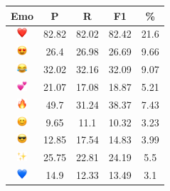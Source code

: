 \documentclass{article}
\begin{document}
\begin{table}
\centering
\begin{tabular}{|c|ccc|c|} \hline
\textbf{Emo} & \textbf{P} & \textbf{R} & \textbf{F1} & \textbf{\%} \\ \hline
\includegraphics[height=0.37cm,width=0.37cm]{img/red_heart.png} & 82.82 & 82.02 & 82.42 & 21.6\\ 
\includegraphics[height=0.37cm,width=0.37cm]{img/smiling_face_with_hearteyes.png} & 26.4 & 26.98 & 26.69 & 9.66\\ 
\includegraphics[height=0.37cm,width=0.37cm]{img/face_with_tears_of_joy.png} & 32.02 & 32.16 & 32.09 & 9.07\\ 
\includegraphics[height=0.37cm,width=0.37cm]{img/two_hearts.png} & 21.07 & 17.08 & 18.87 & 5.21\\ 
\includegraphics[height=0.37cm,width=0.37cm]{img/fire.png} & 49.7 & 31.24 & 38.37 & 7.43\\ 
\includegraphics[height=0.37cm,width=0.37cm]{img/smiling_face_with_smiling_eyes.png} & 9.65 & 11.1 & 10.32 & 3.23\\ 
\includegraphics[height=0.37cm,width=0.37cm]{img/smiling_face_with_sunglasses.png} & 12.85 & 17.54 & 14.83 & 3.99\\ 
\includegraphics[height=0.37cm,width=0.37cm]{img/sparkles.png} & 25.75 & 22.81 & 24.19 & 5.5\\ 
\includegraphics[height=0.37cm,width=0.37cm]{img/blue_heart.png} & 14.9 & 12.33 & 13.49 & 3.1\\ 

\end{tabular}
\end{table}
\end{document}
